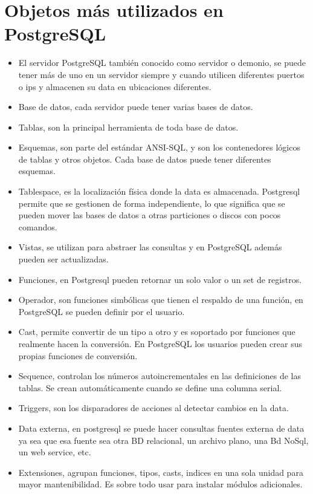 \section{Objetos más utilizados en PostgreSQL} 
\begin{itemize}
\item El servidor PostgreSQL también conocido como servidor o demonio, se puede tener más  de uno en un servidor siempre y cuando utilicen diferentes puertos o ips y almacenen su data en ubicaciones diferentes.
\item Base de datos, cada servidor puede tener varias bases de datos.
\item Tablas, son la principal herramienta de toda base de datos.
\item Esquemas, son parte del estándar ANSI-SQL, y son los contenedores lógicos de tablas y otros objetos. Cada base de datos puede tener diferentes esquemas.
\item Tablespace, es la localización física donde la data es almacenada. Postgresql permite que se gestionen de forma independiente, lo que significa que se pueden mover las bases de datos a otras particiones o discos con pocos comandos.
\item Vistas, se utilizan para abstraer las consultas y en PostgreSQL además pueden ser actualizadas.
\item Funciones, en Postgresql pueden retornar un solo valor o un set de registros. 
\item Operador, son funciones simbólicas que tienen el respaldo de una función, en PostgreSQL se pueden definir por el usuario.
\item Cast, permite convertir de un tipo a otro y es soportado por funciones que realmente hacen la conversión. En PostgreSQL los usuarios pueden crear sus propias funciones de conversión.
\item Sequence, controlan los números autoincrementales en las definiciones de las tablas. Se crean automáticamente cuando se define una columna serial.
\item Triggers, son los disparadores de acciones al detectar cambios en la data.
\item Data externa, en postgresql se puede hacer consultas fuentes externa de data ya sea que esa fuente sea otra BD relacional, un archivo plano, una Bd NoSql, un web service, etc.
\item Extensiones, agrupan funciones, tipos, casts, indices en una sola unidad para mayor mantenibilidad. Es sobre todo usar para instalar módulos adicionales.
\end{itemize}

